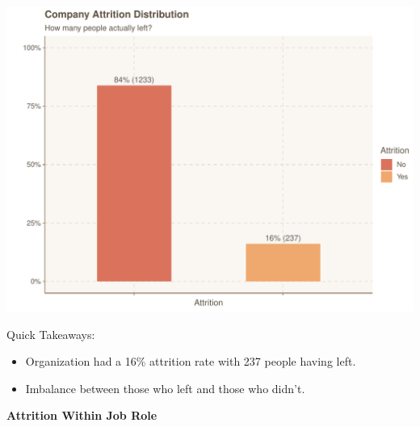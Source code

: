 \documentclass[
]{article}
\providecommand{\tightlist}{%
  \setlength{\itemsep}{0pt}\setlength{\parskip}{0pt}}
\begin{document}
\includegraphics{figures/Overall Attrition Distribution-1.pdf}

Quick Takeaways:

\begin{itemize}
\tightlist
\item
  Organization had a 16\% attrition rate with 237 people having left.
\item
  Imbalance between those who left and those who didn't.
\end{itemize}

\textbf{Attrition Within Job Role}
\end{document}

